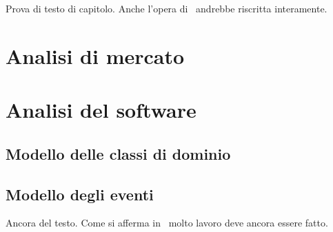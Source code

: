 
Prova di testo di capitolo. Anche l'opera di~\cite{UUID:2005} andrebbe riscritta interamente.

\section{Analisi di mercato}

\section{Analisi del software}

    \subsection{Modello delle classi di dominio}

    \subsection{Modello degli eventi}

Ancora del testo. Come si afferma in~\cite{jones96analysis} molto lavoro deve ancora essere fatto.


